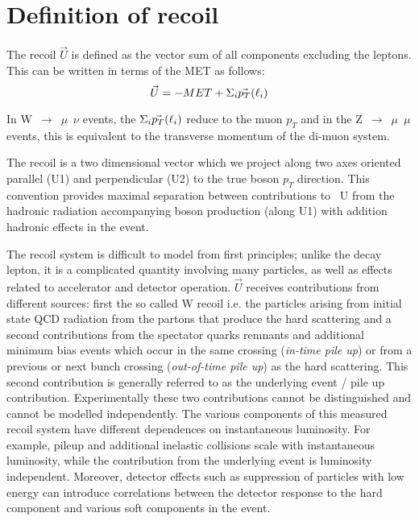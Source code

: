 \section{Definition of recoil}
\label{sec:defRecoil}

The recoil $\vec{U}$ is defined as the vector sum of all components excluding the leptons.
This can be written in terms of the MET as follows:
\begin{equation}
\vec{U}  = - MET +  \Sigma_{i} \space\vec{p_{T}} (\ell_{i}) 
\end{equation}

In W~$\rightarrow$~$\mu$~$\nu$ events, the $\Sigma_{i} \space\vec{p_{T}} (\ell_{i}) $ reduce to the muon $p_{T}$ and in the Z~$\rightarrow$~$\mu$~$\mu$
events, this is equivalent to the transverse momentum of the di-muon system.

The recoil is a two dimensional vector which we project along two axes oriented parallel
(U1) and perpendicular (U2) to the true boson $p_{T}$ direction.
This convention provides maximal separation between contributions to ~U
from the hadronic radiation accompanying boson production (along U1) with addition hadronic effects in the
event.

The recoil system is difficult to model from first principles; unlike the decay lepton, it is a complicated
quantity involving many particles, as well as effects related to accelerator and detector operation.
$\vec{U}$ receives contributions from different sources: first the so called W recoil i.e. the particles arising from initial state QCD radiation from the partons that produce the hard scattering and a second contributions from the spectator quarks remnants and additional minimum bias events which occur in the same crossing ({\it in-time pile up}) or from a previous or next bunch crossing ({\it out-of-time pile up}) as the hard scattering. 
This second contribution is generally referred to as the underlying event / pile up contribution. 
Experimentally these two contributions cannot be distinguished and cannot be modelled independently.
The various components of this measured recoil system have different dependences on instantaneous
luminosity. For example, pileup and additional inelastic collisions scale with instantaneous luminosity, while
the contribution from the underlying event is luminosity independent. Moreover, detector effects such
as suppression of particles with low energy can introduce correlations between the detector response to the hard component 
and various soft components in the event.

